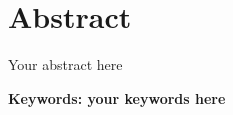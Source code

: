 \chapter*{Abstract}
\normalsize{
Your abstract here
}

\medskip
{\noindent \textbf{Keywords: your keywords here} }
